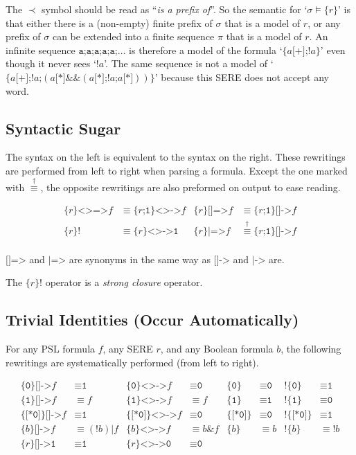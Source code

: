 \documentclass[a4paper,twoside,10pt,DIV=12]{scrreprt}
\DeclareMathOperator{\NOT}{\texttt{!}}
\newcommand{\OR}{\mathbin{\texttt{|}}}
\newcommand{\AND}{\mathbin{\texttt{\&}}}
\newcommand{\ANDALT}{\mathbin{\texttt{\&\&}}}
\newcommand{\CONCAT}{\mathbin{\texttt{;}}}
\newcommand{\0}{\texttt{0}}
\newcommand{\1}{\texttt{1}}
\newcommand{\STAR}[1]{\texttt{[*#1]}}
\newcommand{\PLUS}{\texttt{[+]}}
\newcommand{\eword}{\texttt{[*0]}}
\newcommand{\Esuffix}{\texttt{<>->}}
\newcommand{\Asuffix}{\texttt{[]->}}
\newcommand{\AsuffixALT}{\texttt{|->}}
\newcommand{\EsuffixEQ}{\texttt{<>=>}}
\newcommand{\AsuffixEQ}{\texttt{[]=>}}
\newcommand{\AsuffixALTEQ}{\texttt{|=>}}
\newcommand{\sere}[1]{\texttt{\{}#1\texttt{\}}}
\newcommand{\nsere}[1]{\texttt{!\{}#1\texttt{\}}}
\newcommand{\seren}[1]{\texttt{\{}#1\texttt{\}!}}
\newcommand{\equivM}{\stackrel{\dag}{\equiv}}
\newcommand\samp[1]{`\texttt{#1}'}
\begin{document}
The $\prec$ symbol should be read as ``\emph{is a prefix of}''.  So
the semantic for `$\sigma\vDash \sere{r}$' is that either there is a
(non-empty) finite prefix of $\sigma$ that is a model of $r$, or any
prefix of $\sigma$ can be extended into a finite sequence $\pi$ that
is a model of $r$.  An infinite sequence $\texttt{a;a;a;a;a;}\ldots$
is therefore a model of the formula \samp{$\sere{a\PLUS{}\CONCAT\NOT
    a}$} even though it never sees \samp{$\NOT a$}.  The same sequence
is not a model of \samp{$\sere{a\PLUS{}\CONCAT\NOT
    a\CONCAT(a\STAR{}\ANDALT(a\STAR{}\CONCAT\NOT a\CONCAT
    a\STAR{}))}$} because this SERE does not accept any word.

\subsection{Syntactic Sugar}\label{sec:pslsugar}

The syntax on the left is equivalent to the syntax on the right.
These rewritings are performed from left to right when parsing a
formula.  Except the one marked with $\equivM$, the opposite
rewritings are also preformed on output to ease reading.

\begin{align*}
  \sere{r}\EsuffixEQ f &\equiv \sere{r\CONCAT\1}\Esuffix f &
  \sere{r}\AsuffixEQ f &\equiv \sere{r\CONCAT\1}\Asuffix f\\
  \seren{r} &\equiv \sere{r}\Esuffix \1 &
  \sere{r}\AsuffixALTEQ f &\equivM \sere{r\CONCAT\1}\Asuffix f\\
\end{align*}

$\AsuffixEQ$ and $\AsuffixALTEQ$ are synonyms in the same way as
$\Asuffix$ and $\AsuffixALT$ are.

The $\seren{r}$ operator is a \emph{strong closure} operator.

\subsection{Trivial Identities (Occur Automatically)}

For any PSL formula $f$, any SERE $r$, and any Boolean
formula $b$, the following rewritings are systematically performed
(from left to right).

\begin{align*}
  \sere{\0}\Asuffix f &\equiv \1
& \sere{\0}\Esuffix f &\equiv \0
& \sere{\0} & \equiv \0
& \nsere{\0} & \equiv \1 \\
  \sere{\1}\Asuffix f &\equiv f
& \sere{\1}\Esuffix f &\equiv f
& \sere{\1} & \equiv \1
& \nsere{\1} & \equiv \0 \\
  \sere{\eword}\Asuffix f&\equiv \1
& \sere{\eword}\Esuffix f&\equiv \0
& \sere{\eword} & \equiv \0
& \nsere{\eword} & \equiv \1 \\
  \sere{b}\Asuffix f&\equiv (\NOT{b})\OR f
& \sere{b}\Esuffix f&\equiv b\AND f
& \sere{b} &\equiv b
& \nsere{b} &\equiv \NOT b\\
  \sere{r}\Asuffix \1&\equiv \1
& \sere{r}\Esuffix \0&\equiv \0  \\
\end{align*}
\end{document}
